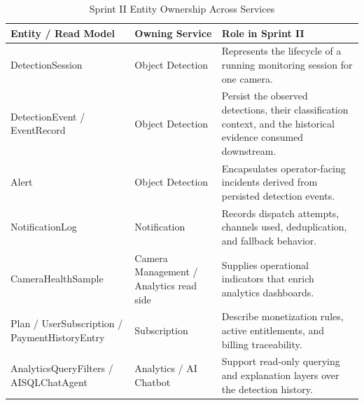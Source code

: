\documentclass[12pt,a4paper,oneside]{report}
\begin{document}

\begin{table}[!htbp]
\centering
\small
\begin{tabularx}{\textwidth}{|p{}|p{}|X|}
\hline
\textbf{Entity / Read Model} & \textbf{Owning Service} & \textbf{Role in Sprint II} \\
\hline
DetectionSession & Object Detection & Represents the lifecycle of a running monitoring session for one camera. \\ \hline
DetectionEvent / EventRecord & Object Detection & Persist the observed detections, their classification context, and the historical evidence consumed downstream. \\ \hline
Alert & Object Detection & Encapsulates operator-facing incidents derived from persisted detection events. \\ \hline
NotificationLog & Notification & Records dispatch attempts, channels used, deduplication, and fallback behavior. \\ \hline
CameraHealthSample & Camera Management / Analytics read side & Supplies operational indicators that enrich analytics dashboards. \\ \hline
Plan / UserSubscription / PaymentHistoryEntry & Subscription & Describe monetization rules, active entitlements, and billing traceability. \\ \hline
AnalyticsQueryFilters / AISQLChatAgent & Analytics / AI Chatbot & Support read-only querying and explanation layers over the detection history. \\ \hline
\end{tabularx}
\caption{Sprint II Entity Ownership Across Services}
\label{tab:app_s2_entity_ownership}
\end{table}

\end{document}
